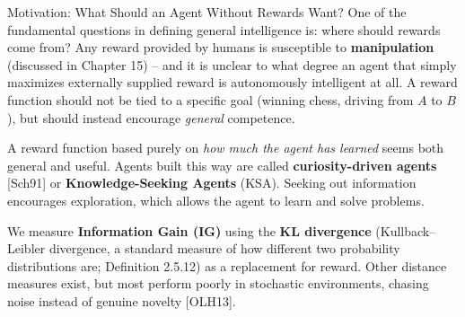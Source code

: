 \documentclass[aspectratio=169,10pt]{beamer}
\begin{document}
\begin{frame}{Motivation: What Should an Agent Without Rewards Want?}
  One of the fundamental questions in defining general intelligence is:
  where should rewards come from? Any reward provided by humans is
  susceptible to \textbf{manipulation} (discussed in Chapter 15) -- and it
  is unclear to what degree an agent that simply maximizes externally
  supplied reward is autonomously intelligent at all. A reward function
  should not be tied to a specific goal (winning chess, driving from $A$
  to $B$), but should instead encourage \emph{general} competence.

  \vspace{0.4em}
  A reward function based purely on \emph{how much the agent has learned}
  seems both general and useful. Agents built this way are called
  \textbf{curiosity-driven agents} [Sch91] or \textbf{Knowledge-Seeking
  Agents} (KSA). Seeking out information encourages exploration, which
  allows the agent to learn and solve problems.

  \vspace{0.4em}
  We measure \textbf{Information Gain (IG)} using the \textbf{KL
  divergence} (Kullback--Leibler divergence, a standard measure of how
  different two probability distributions are; Definition 2.5.12) as a
  replacement for reward. Other distance measures exist, but most perform
  poorly in stochastic environments, chasing noise instead of genuine
  novelty [OLH13].
\end{frame}
\end{document}

